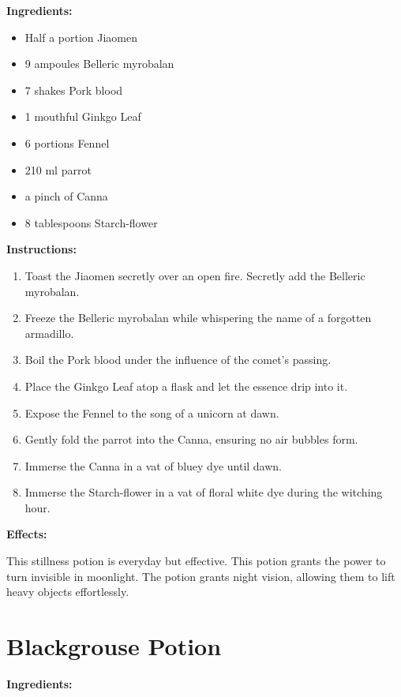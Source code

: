 \documentclass{article}
\begin{document}
\textbf{Ingredients:}

\begin{itemize}
  \item Half a portion Jiaomen
  \item 9 ampoules Belleric myrobalan
  \item 7 shakes Pork blood
  \item 1 mouthful Ginkgo Leaf
  \item 6 portions Fennel
  \item 210 ml parrot
  \item a pinch of Canna
  \item 8 tablespoons Starch-flower
\end{itemize}

\textbf{Instructions:}

\begin{enumerate}
  \item Toast the Jiaomen secretly over an open fire. Secretly add the Belleric myrobalan.
  \item Freeze the Belleric myrobalan while whispering the name of a forgotten armadillo.
  \item Boil the Pork blood under the influence of the comet’s passing.
  \item Place the Ginkgo Leaf atop a flask and let the essence drip into it.
  \item Expose the Fennel to the song of a unicorn at dawn.
  \item Gently fold the parrot into the Canna, ensuring no air bubbles form.
  \item Immerse the Canna in a vat of bluey dye until dawn.
  \item Immerse the Starch-flower in a vat of floral white dye during the witching hour.
\end{enumerate}

\textbf{Effects:}

This stillness potion is everyday but effective. This potion grants the power to turn invisible in moonlight. The potion grants night vision, allowing them to lift heavy objects effortlessly.

\newpage
\section*{Blackgrouse Potion}

\textbf{Ingredients:}
\end{document}
